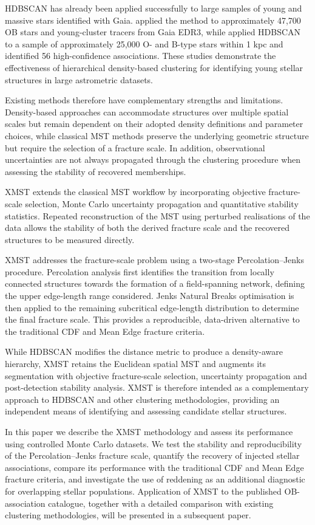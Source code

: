 \documentclass[fleqn,usenatbib]{mnras}
\begin{document}
HDBSCAN has already been applied successfully to large samples of young and massive stars identified with Gaia. \cite{Chemel2022}  applied the method to approximately 47,700 OB stars and young-cluster tracers from Gaia EDR3, while \cite{Quintana2026}  applied HDBSCAN to a sample of approximately 25,000 O- and B-type stars within 1 kpc and identified 56 high-confidence associations. These studies demonstrate the effectiveness of hierarchical density-based clustering for identifying young stellar structures in large astrometric datasets. 

Existing methods therefore have complementary strengths and limitations. Density-based approaches can accommodate structures over multiple spatial scales but remain dependent on their adopted density definitions and parameter choices, while classical MST methods preserve the underlying geometric structure but require the selection of a fracture scale. In addition, observational uncertainties are not always propagated through the clustering procedure when assessing the stability of recovered memberships.

XMST extends the classical MST workflow by incorporating objective fracture-scale selection, Monte Carlo uncertainty propagation and quantitative stability statistics. Repeated reconstruction of the MST using perturbed realisations of the data allows the stability of both the derived fracture scale and the recovered structures to be measured directly.

XMST addresses the fracture-scale problem using a two-stage Percolation–Jenks procedure. Percolation analysis first identifies the transition from locally connected structures towards the formation of a field-spanning network, defining the upper edge-length range considered. Jenks Natural Breaks optimisation is then applied to the remaining subcritical edge-length distribution to determine the final fracture scale. This provides a reproducible, data-driven alternative to the traditional CDF and Mean Edge fracture criteria.

While HDBSCAN modifies the distance metric to produce a density-aware hierarchy, XMST retains the Euclidean spatial MST and augments its segmentation with objective fracture-scale selection, uncertainty propagation and post-detection stability analysis. XMST is therefore intended as a complementary approach to HDBSCAN and other clustering methodologies, providing an independent means of identifying and assessing candidate stellar structures.

In this paper we describe the XMST methodology and assess its performance using controlled Monte Carlo datasets. We test the stability and reproducibility of the Percolation–Jenks fracture scale, quantify the recovery of injected stellar associations, compare its performance with the traditional CDF and Mean Edge fracture criteria, and investigate the use of reddening as an additional diagnostic for overlapping stellar populations. Application of XMST to the published OB-association catalogue, together with a detailed comparison with existing clustering methodologies, will be presented in a subsequent paper.
\end{document}
